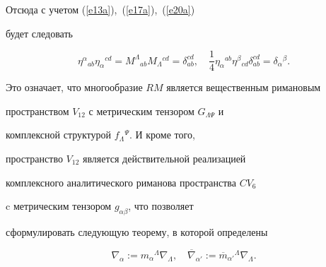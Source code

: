 Отсюда с учетом (\ref{e13a}),~(\ref{e17a}),~(\ref{e20a})


будет следовать


$$




\eta^\alpha{}_{ab}\eta_\alpha{}^{cd}=


M^\Lambda{}_{ab}M_\Lambda{}^{cd}=\delta_{ab}^{cd},\quad


\frac{1}{4}\eta_\alpha{}^{ab}\eta^\beta{}_{cd}


\delta_{ab}^{cd}=\delta_\alpha{}^\beta.


$$


Это означает, что многообразие $RM$ является вещественным римановым


пространством $V_{12}$ с метрическим тензором $G_{\Lambda\Psi}$ и


комплексной структурой $f_\Lambda{}^\Psi$. И кроме того,


пространство $V_{12}$ является действительной реализацией


комплексного аналитического риманова пространства $CV_6$


c метрическим тензором $g_{\alpha\beta}$, что позволяет


сформулировать следующую теорему, в которой определены


\begin{equation}


\label{e41a}


\nabla_\alpha:=m_\alpha{}^\Lambda\nabla_\Lambda,\quad


\overline\nabla_{\alpha '}:=\overline m_{\alpha '}{}^\Lambda\nabla_\Lambda.


\end{equation}





